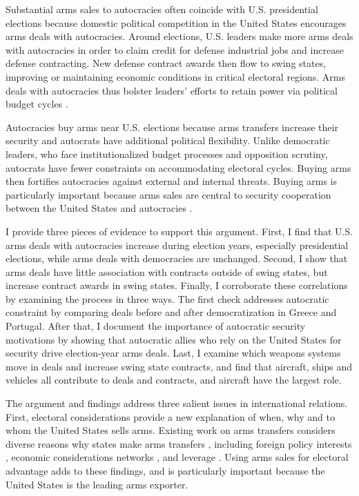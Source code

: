 \documentclass[12pt]{article}
\begin{document}
Substantial arms sales to autocracies often coincide with U.S. presidential elections because domestic political competition in the United States encourages arms deals with autocracies. 
Around elections, U.S. leaders make more arms deals with autocracies in order to claim credit for defense industrial jobs and increase defense contracting.
New defense contract awards then flow to swing states, improving or maintaining economic conditions in critical electoral regions.
Arms deals with autocracies thus bolster leaders' efforts to retain power via political budget cycles \citep{Tufte1978, Mintz1988, DerouenHeo2000}. 


Autocracies buy arms near U.S. elections because arms transfers increase their security and autocrats have additional political flexibility. 
Unlike democratic leaders, who face institutionalized budget processes and opposition scrutiny, autocrats have fewer constraints on accommodating electoral cycles.
Buying arms then fortifies autocracies against external and internal threats.
Buying arms is particularly important because arms sales are central to security cooperation between the United States and autocracies \citep{Yarhi-Miloetal2016, McManusYarhi-Milo2017}.



I provide three pieces of evidence to support this argument.
First, I find that U.S. arms deals with autocracies increase during election years, especially presidential elections, while arms deals with democracies are unchanged. 
Second, I show that arms deals have little association with contracts outside of swing states, but increase contract awards in swing states. 
Finally, I corroborate these correlations by examining the process in three ways.
The first check addresses autocratic constraint by comparing deals before and after democratization in Greece and Portugal. 
After that, I document the importance of autocratic security motivations by showing that autocratic allies who rely on the United States for security drive election-year arms deals. 
Last, I examine which weapons systems move in deals and increase swing state contracts, and find that aircraft, ships and vehicles all contribute to deals and contracts, and aircraft have the largest role. 


The argument and findings address three salient issues in international relations. 
First, electoral considerations provide a new explanation of when, why and to whom the United States sells arms. 
Existing work on arms transfers considers diverse reasons why states make arms transfers \citep{WillardsonJohnson2022}, including foreign policy interests \citep{Thralletal2020}, economic considerations \citep{Bitzinger1994} networks \citep{Thurneretal2019}, and leverage \citep{Spindel2023}. 
Using arms sales for electoral advantage adds to these findings, and is particularly important because the United States is the leading arms exporter.
\end{document}
